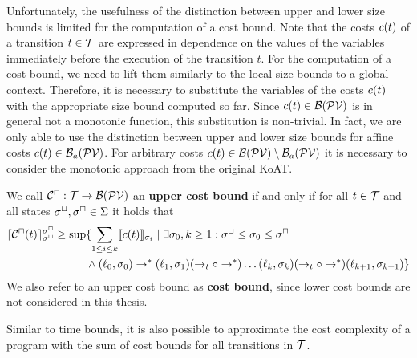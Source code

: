 Unfortunately, the usefulness of the distinction between upper and lower size bounds is limited for the computation of a cost bound.
Note that the costs $c(t)$ of a transition $t \in \mathcal{T}$ are expressed in dependence on the values of the variables immediately before the execution of the transition $t$.
For the computation of a cost bound, we need to lift them similarly to the local size bounds to a global context.
Therefore, it is necessary to substitute the variables of the costs $c(t)$ with the appropriate size bound computed so far.
Since $c(t) \in \mathcal{B}(\mathcal{PV})$ is in general not a monotonic function, this substitution is non-trivial.
In fact, we are only able to use the distinction between upper and lower size bounds for affine costs $c(t) \in \mathcal{B}_a(\mathcal{PV})$.
For arbitrary costs $c(t) \in \mathcal{B}(\mathcal{PV}) \setminus \mathcal{B}_a(\mathcal{PV})$ it is necessary to consider the monotonic approach from the original KoAT.

\begin{definition}
  We call ${\mathcal{C}^\sqcap}: \mathcal{T} \rightarrow \mathcal{B}(\mathcal{PV})$ an \textbf{upper cost bound} if and only if for all $t \in \mathcal{T}$ and all states ${\sigma^\sqcup}, {\sigma^\sqcap} \in \Sigma$ it holds that
  \begin{align*}
    \lceil {\mathcal{C}^\sqcap}(t) \rceil^{{\sigma^\sqcap}}_{{\sigma^\sqcup}} \geq \sup & \lbrace  \sum_{1 \leq i \leq k} \llbracket c(t) \rrbracket_{\sigma_i} \mid \exists \sigma_0, k \geq 1: {\sigma^\sqcup} \leq \sigma_0 \leq {\sigma^\sqcap} \\
      & \wedge (\ell_0, \sigma_0) \rightarrow^* (\ell_1, \sigma_1) (\rightarrow_t \circ \rightarrow^*) \dots (\ell_k, \sigma_k) (\rightarrow_t \circ \rightarrow^*) (\ell_{k+1}, \sigma_{k+1})  \rbrace
  \end{align*}
  We also refer to an upper cost bound as \textbf{cost bound}, since lower cost bounds are not considered in this thesis.
\end{definition}

Similar to time bounds, it is also possible to approximate the cost complexity of a program with the sum of cost bounds for all transitions in $\mathcal{T}$.


